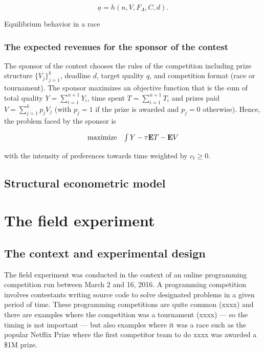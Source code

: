 \documentclass[12pt,]{article}
\begin{document}
\[{\underline a}= h(n, V, F_A, C, d).\]

\begin{corollary}

Equilibrium behavior in a race

\end{corollary}

\subsubsection{The expected revenues for the sponsor of the
contest}\label{the-expected-revenues-for-the-sponsor-of-the-contest}

The sponsor of the contest chooses the rules of the competition
including prize structure \(\{V_j\}_{j=1}^k\), deadline \(d\), target
quality \(q\), and competition format (race or tournament). The sponsor
maximizes an objective function that is the sum of total quality
\(Y=\sum_{i=1}^{n+1} Y_i\), time spent \(T=\sum_{i=1}^{n+1} T_i\) and
prizes paid \(V=\sum_{j=1}^k p_{j} V_j\) (with \(p_j=1\) if the prize is
awarded and \(p_j=0\) otherwise). Hence, the problem faced by the
sponsor is

\[\begin{array}{ll}
    \mbox{maximize} & \int {Y}   -  {\tau}{{\bf E}}{T} - {{\bf E}}{V}
  \end{array}\]

with the intensity of preferences towards time weighted by
\(c_t\geq 0\).

\subsection{Structural econometric
model}\label{structural-econometric-model}

\section{The field experiment}\label{the-field-experiment}

\subsection{The context and experimental
design}\label{the-context-and-experimental-design}

The field experiment was conducted in the context of an online
programming competition run between March 2 and 16, 2016. A programming
competition involves contestants writing source code to solve designated
problems in a given period of time. These programming competitions are
quite common (xxxx) and there are examples where the competition was a
tournament (xxxx) --- so the timing is not important --- but also
examples where it was a race such as the popular Netflix Prize where the
first competitor team to do xxxx was awarded a \$1M prize.
\end{document}
